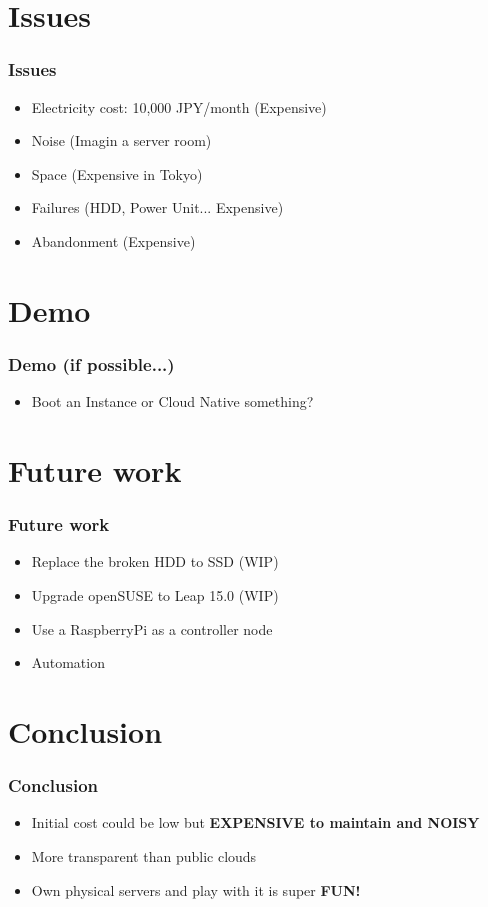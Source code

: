 \documentclass[aspectratio=169,11pt,hyperref={colorlinks=true}]{beamer}
\begin{document}
\section{Issues}
\begin{frame}
  \frametitle{Issues}
  \begin{itemize}
    \item Electricity cost: 10,000 JPY/month (Expensive)
    \item Noise (Imagin a server room)
    \item Space (Expensive in Tokyo)
    \item Failures (HDD, Power Unit... Expensive)
    \item Abandonment (Expensive)
  \end{itemize}
\end{frame}

\section{Demo}
\begin{frame}
  \frametitle{Demo (if possible...)}
  \begin{itemize}
    \item Boot an Instance or Cloud Native something?
  \end{itemize}
\end{frame}

\section{Future work}
\begin{frame}
  \frametitle{Future work}
  \begin{itemize}
    \item Replace the broken HDD to SSD (WIP)
    \item Upgrade openSUSE to Leap 15.0 (WIP)
    \item Use a RaspberryPi as a controller node
    \item Automation
  \end{itemize}
\end{frame}

\section{Conclusion}
\begin{frame}
  \frametitle{Conclusion}
  \begin{itemize}
    \item Initial cost could be low but \bf{EXPENSIVE} to maintain and \bf{NOISY}
    \item More transparent than public clouds
    \item Own physical servers and play with it is super \bf{FUN}!
  \end{itemize}
\end{frame}
\end{document}

